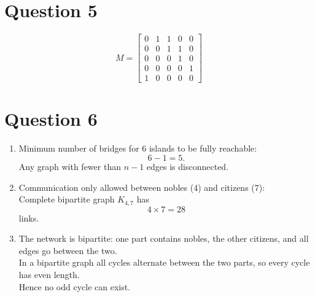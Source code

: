 \documentclass[twoside]{article}
\begin{document}
\section*{Question 5}

\[  
    M = 
    \begin{bmatrix}
        0 & 1 & 1 & 0 & 0 \\
        0 & 0 & 1 & 1 & 0 \\
        0 & 0 & 0 & 1 & 0 \\
        0 & 0 & 0 & 0 & 1 \\
        1 & 0 & 0 & 0 & 0
    \end{bmatrix}
\]

\section*{Question 6}

\begin{enumerate}
    \item[(a)]  Minimum number of bridges for 6 islands to be fully reachable:  \[6 - 1 = 5.\]
                Any graph with fewer than $n-1$ edges is disconnected.

    \item[(b)]  Communication only allowed between nobles (4) and citizens (7): \\  
                Complete bipartite graph $K_{4,7}$ has  \[4 \times 7 = 28\] links.

    \item[(c)]  The network is bipartite: one part contains nobles, the other citizens, and all edges go between the two. \\  
                In a bipartite graph all cycles alternate between the two parts, so every cycle has even length. \\  
                Hence no odd cycle can exist.

\end{enumerate}
\end{document}

